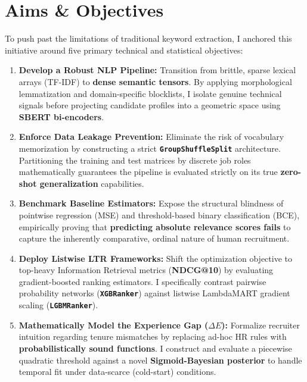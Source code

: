 \chapter{Aims \& Objectives}
\label{sec:objectives}

To push past the limitations of traditional keyword extraction, I anchored this initiative around five primary technical and statistical objectives:

\begin{enumerate}[topsep=4pt, itemsep=4pt]
    \item \textbf{Develop a Robust NLP Pipeline:} Transition from brittle, sparse lexical arrays (TF-IDF) to \textbf{dense semantic tensors}. By applying morphological lemmatization and domain-specific blocklists, I isolate genuine technical signals before projecting candidate profiles into a geometric space using \textbf{SBERT bi-encoders}.
    
    \item \textbf{Enforce Data Leakage Prevention:} Eliminate the risk of vocabulary memorization by constructing a strict \textbf{\texttt{GroupShuffleSplit}} architecture. Partitioning the training and test matrices by discrete job roles mathematically guarantees the pipeline is evaluated strictly on its true \textbf{zero-shot generalization} capabilities.
    
    \item \textbf{Benchmark Baseline Estimators:} Expose the structural blindness of pointwise regression (MSE) and threshold-based binary classification (BCE), empirically proving that \textbf{predicting absolute relevance scores fails} to capture the inherently comparative, ordinal nature of human recruitment.
    
    \item \textbf{Deploy Listwise LTR Frameworks:} Shift the optimization objective to top-heavy Information Retrieval metrics (\textbf{NDCG@10}) by evaluating gradient-boosted ranking estimators. I specifically contrast pairwise probability networks (\textbf{\texttt{XGBRanker}}) against listwise LambdaMART gradient scaling (\textbf{\texttt{LGBMRanker}}).
    
    \item \textbf{Mathematically Model the Experience Gap ($\Delta E$):} Formalize recruiter intuition regarding tenure mismatches by replacing ad-hoc HR rules with \textbf{probabilistically sound functions}. I construct and evaluate a piecewise quadratic threshold against a novel \textbf{Sigmoid-Bayesian posterior} to handle temporal fit under data-scarce (cold-start) conditions.
\end{enumerate}


